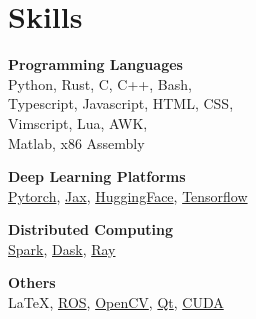 
\section{\sc Skills}

{\bf Programming Languages} \\
Python, Rust, C, C++, Bash, \\
Typescript, Javascript, HTML, CSS, \\
Vimscript, Lua, AWK, \\
Matlab, x86 Assembly

{\bf Deep Learning Platforms} \\
\href{https://pytorch.org/}{Pytorch},
\href{https://jax.readthedocs.io/}{Jax},
\href{https://huggingface.co}{HuggingFace},
\href{https://www.tensorflow.org/}{Tensorflow}

{\bf Distributed Computing} \\
\href{https://spark.apache.org}{Spark},
\href{https://www.dask.org}{Dask},
\href{https://www.ray.io}{Ray}

{\bf Others} \\
{\LaTeX},
\href{http://www.ros.org/}{ROS},
\href{https://opencv.org/}{OpenCV},
\href{https://www.qt.io}{Qt},
\href{https://docs.nvidia.com/cuda/}{CUDA}

